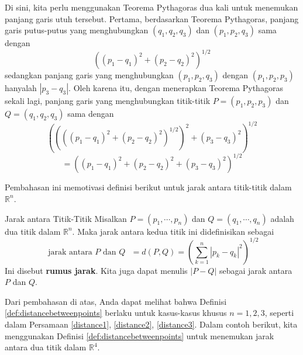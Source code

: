 Di sini, kita perlu menggunakan Teorema Pythagoras dua kali untuk menemukan panjang
garis utuh tersebut. Pertama, berdasarkan Teorema Pythagoras, panjang garis putus-putus yang menghubungkan $\left(
q_{1},q_{2},q_{3}\right) $ dan $\left( p_{1},p_{2},q_{3}\right) $ sama dengan
\begin{equation*}
\left( \left( p_{1}-q_{1}\right) ^{2}+\left( p_{2}-q_{2}\right) ^{2}\right)
^{1/2}
\end{equation*}
sedangkan panjang garis yang menghubungkan $\left( p_{1},p_{2},q_{3}\right) $ dengan
$\left( p_{1},p_{2},p_{3}\right) $ hanyalah $\left| p_{3}-q_{3}\right| .$ Oleh karena itu, dengan menerapkan Teorema Pythagoras sekali lagi, panjang garis yang menghubungkan
titik-titik $P = \left( p_{1},p_{2},p_{3}\right) $ dan $Q = \left(
q_{1},q_{2},q_{3}\right) $ sama dengan
\begin{equation*}
\left( \left( \left( \left( p_{1}-q_{1}\right) ^{2}+\left(
p_{2}-q_{2}\right) ^{2}\right) ^{1/2}\right) ^{2}+\left( p_{3}-q_{3}\right)
^{2}\right) ^{1/2}
\end{equation*}
\begin{equation}
 =\left( \left( p_{1}-q_{1}\right) ^{2}+\left( p_{2}-q_{2}\right)
^{2}+\left( p_{3}-q_{3}\right) ^{2}\right) ^{1/2}
\label{distance3}
\end{equation}

Pembahasan ini memotivasi definisi berikut untuk jarak antara titik-titik dalam $\mathbb{R}^n$.

\begin{definition}{Jarak antara Titik-Titik}\label{def:distancebetweenpoints}
Misalkan $P=\left( p_{1},\cdots ,p_{n}\right) $ dan
$Q=\left( q_{1},\cdots ,q_{n}\right) $ adalah dua titik dalam
$\mathbb{R}^{n}$. Maka jarak
antara kedua titik ini didefinisikan sebagai
\begin{equation*}
\text{ jarak antara }P\text{ dan } Q\text{ } =
d( P, Q ) = \left( \sum_{k=1}^{n}\left\vert
p_{k}-q_{k}\right\vert ^{2}\right) ^{1/2}
\end{equation*}
Ini disebut \textbf{rumus jarak}. Kita juga dapat menulis $\left\vert P - Q \right\vert $ sebagai jarak antara $P$ dan $Q$.
\end{definition}

Dari pembahasan di atas, Anda dapat melihat bahwa Definisi \ref{def:distancebetweenpoints} berlaku untuk kasus-kasus khusus $n=1,2,3$, seperti dalam
Persamaan \ref{distance1}, \ref{distance2}, \ref{distance3}.
Dalam contoh berikut, kita menggunakan Definisi \ref{def:distancebetweenpoints} untuk menemukan jarak antara dua titik dalam
$\mathbb{R}^4$.

